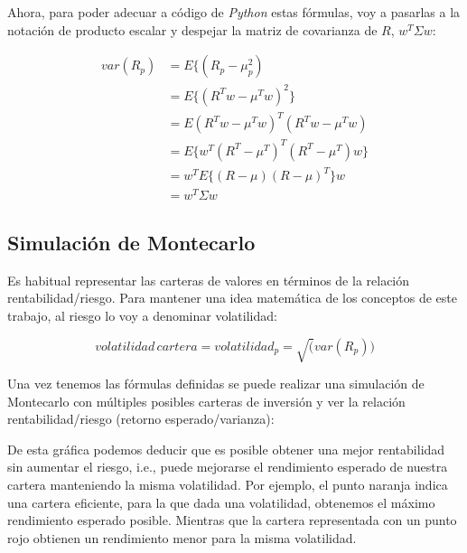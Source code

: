 Ahora, para poder adecuar a código de \emph{Python} estas fórmulas, voy a pasarlas a la notación de producto escalar y despejar la matriz de covarianza de $R$, $w^{T}\Sigma w$:

\begin{equation} \label{eq:8}
\begin{aligned}
	var(R_{p}) &= E\{(R_{p}-\mu_{p}^{2})\\
	&= E\{(R^{T}w - \mu^{T}w)^{2}\} \\
	&= E{(R^{T}w - \mu^{T}w)^{T}(R^{T}w - \mu^{T}w)} \\
	&= E\{w^{T}(R^{T}-\mu^{T})^{T}(R^{T}-\mu^{T})w\} \\
	&= w^{T}E\{(R-\mu)(R-\mu)^{T}\}w \\
	&= w^{T}\Sigma w
\end{aligned}
\end{equation}

\subsection{Simulación de Montecarlo}

Es habitual representar las carteras de valores en términos de la relación rentabilidad/riesgo. Para mantener una idea matemática de los conceptos de este trabajo, al riesgo lo voy a denominar volatilidad:

\begin{equation}
	volatilidad\, cartera = volatilidad_{p} = \sqrt(var(R_{p}))
\end{equation}

Una vez tenemos las fórmulas definidas se puede realizar una simulación de Montecarlo \citep{simulacion_montecarlo} con múltiples posibles carteras de inversión y ver la relación rentabilidad/riesgo (retorno esperado/varianza):


De esta gráfica podemos deducir que es posible obtener una mejor rentabilidad sin aumentar el riesgo, i.e., puede mejorarse el rendimiento esperado de nuestra cartera manteniendo la misma volatilidad. Por ejemplo, el punto naranja indica una cartera eficiente, para la que dada una volatilidad, obtenemos el máximo rendimiento esperado posible. Mientras que la cartera representada con un punto rojo obtienen un rendimiento menor para la misma volatilidad. 

